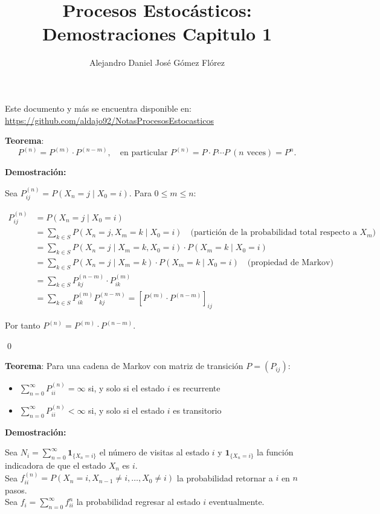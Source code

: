 \documentclass[12pt,a4paper]{article}
\title{Procesos Estocásticos: Demostraciones Capitulo 1}
\author{Alejandro Daniel José Gómez Flórez}
\date{}
\newcommand{\teorema}[1]{%
\begin{teoremabox}
\textbf{Teorema}: #1
\end{teoremabox}
}
\begin{document}
\maketitle

Este documento y más se encuentra disponible en: \\
\url{https://github.com/aldajo92/NotasProcesosEstocasticos}

\teorema{
\begin{equation*}
P^{(n)} = P^{(m)} \cdot P^{(n-m)}, \quad \text{en particular } P^{(n)} = P \cdot P \cdots P \ (\text{$n$ veces}) = P^n.
\end{equation*}}

\textbf{Demostración:}

Sea $P_{ij}^{(n)} = P(X_n = j \mid X_0 = i)$. Para $0 \leq m \leq n$:

\begin{align*}
P_{ij}^{(n)} &= P(X_n = j \mid X_0 = i) \\
&= \sum_{k \in S} P(X_n = j, X_m = k \mid X_0 = i) \quad \text{(partición de la probabilidad total respecto a $X_m$)} \\
&= \sum_{k \in S} P(X_n = j \mid X_m = k, X_0 = i) \cdot P(X_m = k \mid X_0 = i) \\
&= \sum_{k \in S} P(X_n = j \mid X_m = k) \cdot P(X_m = k \mid X_0 = i) \quad \text{(propiedad de Markov)} \\
&= \sum_{k \in S} P_{kj}^{(n-m)} \cdot P_{ik}^{(m)} \\
&= \sum_{k \in S} P_{ik}^{(m)} P_{kj}^{(n-m)} = [P^{(m)} \cdot P^{(n-m)}]_{ij}
\end{align*}

Por tanto $P^{(n)} = P^{(m)} \cdot P^{(n-m)}$.

\qed


\teorema{Para una cadena de Markov con matriz de transición $P = (P_{ij})$:
\begin{itemize}
    \item $\sum_{n=0}^{\infty} P_{ii}^{(n)} = \infty$ si, y solo si el estado $i$ es recurrente
    \item $\sum_{n=0}^{\infty} P_{ii}^{(n)} < \infty$ si, y solo si el estado $i$ es transitorio
\end{itemize}}

\textbf{Demostración:}

Sea $N_i = \sum_{n=0}^{\infty} \mathbf{1}_{\{X_n = i\}}$ el número de visitas al estado $i$ y $\mathbf{1}_{\{X_n = i\}}$ la función indicadora de que el estado $X_n$ es $i$. \\
Sea $f^{(n)}_{ii} = P(X_n = i, X_{n-1} \neq i, \ldots, X_0 \neq i)$ la probabilidad retornar a $i$ en $n$ pasos.\\
Sea $f_{i} = \sum_{n=0}^{\infty} f^{n}_{ii}$ la probabilidad regresar al estado $i$ eventualmente.
\end{document}
